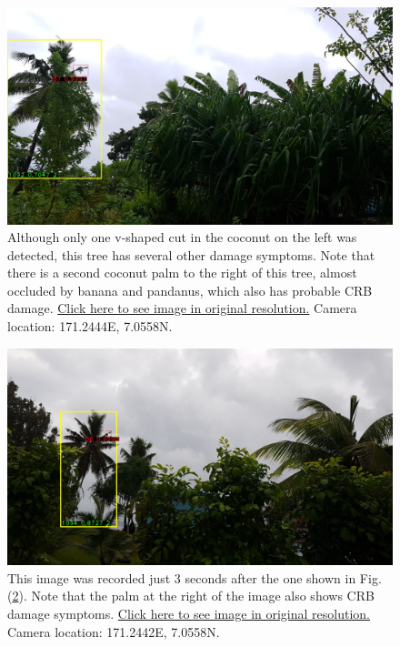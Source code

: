 \documentclass[12pt,letterpaper,english,bibliography=totocnumbered, abstract=on]{scrartcl}
\begin{document}
\begin{figure}
	\centering
	\includegraphics[width=\linewidth]{images/IMG_20231007_125004}
	\caption{Although only one v-shaped cut in the coconut on the left was detected, this tree has several other damage symptoms. Note that there is a second coconut palm to the right of this tree, almost occluded by banana and pandanus, which also has probable CRB damage. \href{https://aubreymoore.github.io/Majuro01_updated/700_990/20231007/12/IMG_20231007_125004.jpg}{Click here to see image in original resolution.} Camera location: 171.2444\degree E, 7.0558\degree N.}
	\label{fig:125004}
\end{figure}

\begin{figure}
	\centering
	\includegraphics[width=\linewidth]{images/IMG_20231007_125007}
	\caption{This image was recorded just 3 seconds after the one shown in Fig. (\ref{fig:125007}). Note that the palm at the right of the image also shows CRB damage symptoms. \href{https://aubreymoore.github.io/Majuro01_updated/700_990/20231007/12/IMG_20231007_125007.jpg}{Click here to see image in original resolution.} Camera location:  171.2442\degree E, 7.0558\degree N.}
	\label{fig:125007}
\end{figure}
\end{document}
